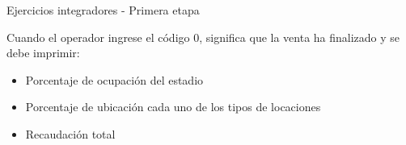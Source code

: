 \documentclass[xcolor=pdftex,table,11pt]{beamer}
\begin{document}
\begin{frame}[allowframebreaks]{Ejercicios integradores - Primera etapa}
\begin{enumerate}
\newpage
Cuando el operador ingrese el código 0, significa que la venta ha finalizado y se debe imprimir:
\begin{itemize}
\item Porcentaje de ocupación del estadio
\item Porcentaje de ubicación cada uno de los tipos de locaciones
\item Recaudación total

\end{itemize}
\href{https://github.com/danis963/informaticaI_IUA/blob/main/c/src/5-break_cont_1.c}{}

\end{enumerate}




 
\end{frame}
\end{document}
